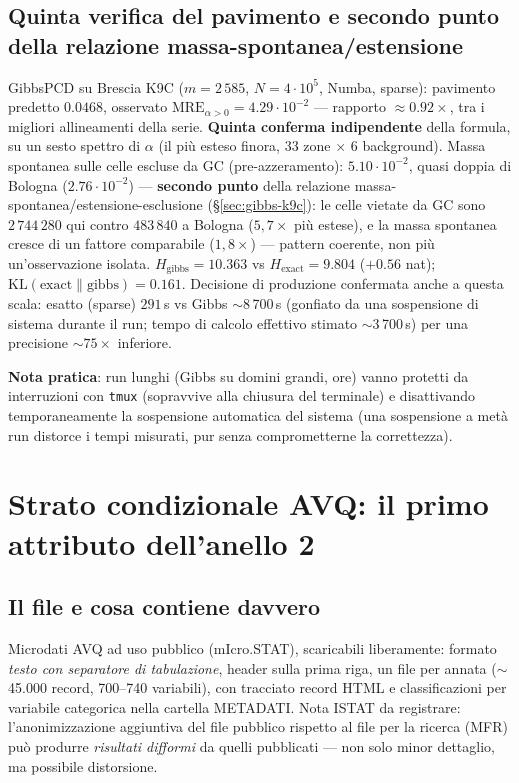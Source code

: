 \documentclass[11pt,a4paper]{article}
\newcommand{\code}[1]{\texttt{#1}}
\begin{document}
\subsection{Quinta verifica del pavimento e secondo punto della
relazione massa-spontanea/estensione}
GibbsPCD su Brescia K9C ($m=2\,585$, $N=4\cdot10^5$, Numba, sparse):
pavimento predetto $0.0468$, osservato $\text{MRE}_{\alpha>0}=4.29
\cdot10^{-2}$ --- rapporto $\approx0.92\times$, tra i migliori
allineamenti della serie. \textbf{Quinta conferma indipendente} della
formula, su un sesto spettro di $\alpha$ (il pi\`u esteso finora, $33$
zone $\times$ $6$ background). Massa spontanea sulle celle escluse da
GC (pre-azzeramento): $5.10\cdot10^{-2}$, quasi doppia di Bologna
($2.76\cdot10^{-2}$) --- \textbf{secondo punto} della relazione
massa-spontanea/estensione-esclusione (\S\ref{sec:gibbs-k9c}): le celle
vietate da GC sono $2\,744\,280$ qui contro $483\,840$ a Bologna
($5{,}7\times$ pi\`u estese), e la massa spontanea cresce di un fattore
comparabile ($1{,}8\times$) --- pattern coerente, non pi\`u
un'osservazione isolata. $H_{\text{gibbs}}=10.363$ vs
$H_{\text{exact}}=9.804$ ($+0.56$ nat);
$\mathrm{KL}(\text{exact}\|\text{gibbs})=0.161$. Decisione di produzione
confermata anche a questa scala: esatto (sparse) $291$\,s vs Gibbs
$\sim$8\,700\,s (gonfiato da una sospensione di sistema durante il run;
tempo di calcolo effettivo stimato $\sim$3\,700\,s) per una precisione
$\sim75\times$ inferiore.

\medskip\noindent\textbf{Nota pratica}: run lunghi (Gibbs su domini
grandi, ore) vanno protetti da interruzioni con \code{tmux} (sopravvive
alla chiusura del terminale) e disattivando temporaneamente la
sospensione automatica del sistema (una sospensione a met\`a run
distorce i tempi misurati, pur senza comprometterne la correttezza).

\section{Strato condizionale AVQ: il primo attributo dell'anello 2}
\label{sec:avq}

\subsection{Il file e cosa contiene davvero}
Microdati AVQ ad uso pubblico (mIcro.STAT), scaricabili liberamente:
formato \emph{testo con separatore di tabulazione}, header sulla prima
riga, un file per annata ($\sim$45.000 record, 700--740 variabili), con
tracciato record HTML e classificazioni per variabile categorica nella
cartella METADATI. Nota ISTAT da registrare: l'anonimizzazione aggiuntiva
del file pubblico rispetto al file per la ricerca (MFR) pu\`o produrre
\emph{risultati difformi} da quelli pubblicati --- non solo minor
dettaglio, ma possibile distorsione.
\end{document}
